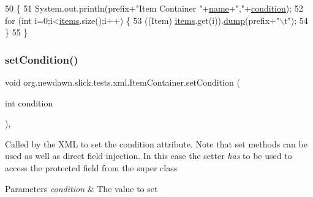 \begin{DoxyCode}
50                                     \{
51         System.out.println(prefix+\textcolor{stringliteral}{"Item Container "}+\mbox{\hyperlink{classorg_1_1newdawn_1_1slick_1_1tests_1_1xml_1_1_item_a5bbf1293e61bcd4d8c543caae4e3c967}{name}}+\textcolor{stringliteral}{","}+\mbox{\hyperlink{classorg_1_1newdawn_1_1slick_1_1tests_1_1xml_1_1_item_a17a71d3cab0191fbd90b875a6483efea}{condition}});
52         \textcolor{keywordflow}{for} (\textcolor{keywordtype}{int} i=0;i<\mbox{\hyperlink{namespaceitems}{items}}.size();i++) \{
53             ((Item) \mbox{\hyperlink{namespaceitems}{items}}.get(i)).\mbox{\hyperlink{classorg_1_1newdawn_1_1slick_1_1tests_1_1xml_1_1_item_container_a4c88e3641269fe73a03a477ccb18fb68}{dump}}(prefix+\textcolor{stringliteral}{"\(\backslash\)t"});
54         \}
55     \}
\end{DoxyCode}
\mbox{\label{classorg_1_1newdawn_1_1slick_1_1tests_1_1xml_1_1_item_container_ae791d328860ed0ff71bfbc42cdb91705}} 
\subsubsection{\texorpdfstring{set\+Condition()}{setCondition()}}
{\footnotesize\ttfamily void org.\+newdawn.\+slick.\+tests.\+xml.\+Item\+Container.\+set\+Condition (\begin{DoxyParamCaption}\item[{int}]{condition }\end{DoxyParamCaption})\hspace{0.3cm}{\ttfamily [inline]}, {\ttfamily [private]}}

Called by the X\+ML to set the condition attribute. Note that set methods can be used as well as direct field injection. In this case the setter {\itshape has} to be used to access the protected field from the super class


\begin{DoxyParams}{Parameters}
{\em condition} & The value to set \\
\hline
\end{DoxyParams}

